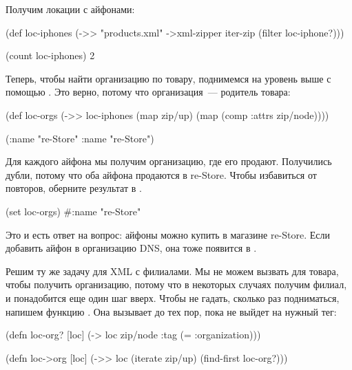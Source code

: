 Получим локации с айфонами:

\begin{english}
  \begin{clojure}
(def loc-iphones
  (->> "products.xml"
       ->xml-zipper
       iter-zip
       (filter loc-iphone?)))

(count loc-iphones)
2
  \end{clojure}
\end{english}

Теперь, чтобы найти организацию по товару, поднимемся на уровень выше с помощью
. Это верно, потому что организация~--- родитель товара:

\begin{english}
  \begin{clojure}
(def loc-orgs
  (->> loc-iphones
       (map zip/up)
       (map (comp :attrs zip/node))))

({:name "re-Store"} {:name "re-Store"})
  \end{clojure}
\end{english}

Для каждого айфона мы получим организацию, где его продают. Получились дубли,
потому что оба айфона продаются в re-Store. Чтобы избавиться от повторов,
оберните результат в .

\begin{english}
  \begin{clojure}
(set loc-orgs)
#{{:name "re-Store"}}
  \end{clojure}
\end{english}

Это и есть ответ на вопрос: айфоны можно купить в магазине re-Store. Если
добавить айфон в организацию DNS, она тоже появится в .

Решим ту же задачу для XML с филиалами. Мы не можем вызвать  для товара,
чтобы получить организацию, потому что в некоторых случаях получим филиал, и
понадобится еще один шаг вверх. Чтобы не гадать, сколько раз подниматься,
напишем функцию . Она вызывает  до тех пор, пока не выйдет на
нужный тег:

\begin{english}
  \begin{clojure}
(defn loc-org? [loc]
  (-> loc zip/node :tag (= :organization)))

(defn loc->org [loc]
  (->> loc
       (iterate zip/up)
       (find-first loc-org?)))
  \end{clojure}
\end{english}

